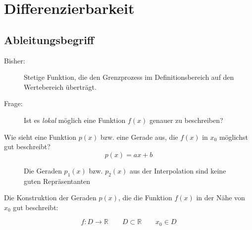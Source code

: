 \chapter{Differenzierbarkeit}
\section{Ableitungsbegriff}

\begin{description}
	\item[Bisher:]Stetige Funktion, die den Grenzprozess im Definitionsbereich auf den Wertebereich überträgt.
	\item[Frage:]Ist es \emph{lokal} möglich eine Funktion \( f(x) \) genauer zu beschreiben? 
\end{description}

\noindent Wie sieht eine Funktion \( p(x) \) bzw. eine Gerade aus, die \( f(x) \) in \( x_0 \) möglichst gut beschreibt?
\[
p(x)=ax+b 
\]
\begin{figure}[h]
	\begin{center}
\end{center}
\caption{Die Geraden \( p_1(x) \) bzw. \( p_2(x) \) aus der Interpolation sind keine guten Repräsentanten}
\end{figure}


\noindent Die Konstruktion der Geraden \( p(x) \), die die Funktion \( f(x) \) in der Nähe von \( x_0 \) gut beschreibt:

\[
	f:D\rightarrow\mathbb{R} \qquad D\subset\mathbb{R} \qquad x_0 \in D
\]

